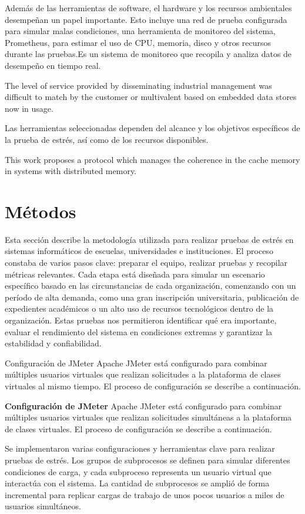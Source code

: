 \documentclass{article}
\begin{document}
Además de las herramientas de software, el hardware y los recursos ambientales desempeñan un papel importante. Esto incluye una red de prueba configurada para simular malas condiciones, una herramienta de monitoreo del sistema, Prometheus, para estimar el uso de CPU, memoria, disco y otros recursos durante las pruebas.Es un sistema de monitoreo que recopila y analiza datos de desempeño en tiempo real.

The level of service provided by disseminating industrial management was difficult to match by the customer or multivalent based on embedded data stores now in usage. \parencite{Xavier2025276}

Las herramientas seleccionadas dependen del alcance y los objetivos específicos de la prueba de estrés, así como de los recursos disponibles.

This work proposes a protocol which manages the coherence in the cache memory in systems with distributed memory. \parencite{Castro2007170}

\section{Métodos} 

Esta sección describe la metodología utilizada para realizar pruebas de estrés en sistemas informáticos de escuelas, universidades e instituciones. El proceso constaba de varios pasos clave: preparar el equipo, realizar pruebas y recopilar métricas relevantes. Cada etapa está diseñada para simular un escenario específico basado en las circunstancias de cada organización, comenzando con un período de alta demanda, como una gran inscripción universitaria, publicación de expedientes académicos o un alto uso de recursos tecnológicos dentro de la organización. Estas pruebas nos permitieron identificar qué era importante, evaluar el rendimiento del sistema en condiciones extremas y garantizar la estabilidad y confiabilidad.

  {Configuración de JMeter}
Apache JMeter está configurado para combinar múltiples usuarios virtuales que realizan solicitudes a la plataforma de clases virtuales al mismo tiempo. El proceso de configuración se describe a continuación.

\textbf{Configuración de JMeter}
Apache JMeter está configurado para combinar múltiples usuarios virtuales que realizan solicitudes simultáneas a la plataforma de clases virtuales. El proceso de configuración se describe a continuación.

Se implementaron varias configuraciones y herramientas clave para realizar pruebas de estrés. Los grupos de subprocesos se definen para simular diferentes condiciones de carga, y cada subproceso representa un usuario virtual que interactúa con el sistema. La cantidad de subprocesos se amplió de forma incremental para replicar cargas de trabajo de unos pocos usuarios a miles de usuarios simultáneos.
\end{document}
